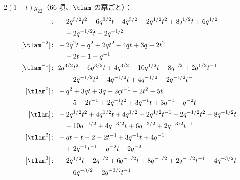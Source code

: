 $2(1 + t) g_{22}$（66 項、$\tlam$ の冪ごと）：
\begin{align*}
[\tlam^{-3}]\colon\ & -2 q^{3/2} t^{2} -6 q^{3/2} t -4 q^{3/2} +2 q^{1/2} t^{2} +8 q^{1/2} t +6 q^{1/2} \\
& \quad -2 q^{-1/2} t -2 q^{-1/2} \\
[\tlam^{-2}]\colon\ & -2 q^{2} t -q^{2} +2 q t^{2} +4 q t +3 q -2 t^{2} \\
& \quad -2 t -1 -q^{-1} \\
[\tlam^{-1}]\colon\ & 2 q^{3/2} t^{2} +6 q^{3/2} t +4 q^{3/2} -10 q^{1/2} t -8 q^{1/2} +2 q^{1/2} t^{-1} \\
& \quad -2 q^{-1/2} t^{2} +4 q^{-1/2} t +4 q^{-1/2} -2 q^{-1/2} t^{-1} \\
[\tlam^{0}]\colon\ & -q^{2} +3 q t +3 q +2 q t^{-1} -2 t^{2} -5 t \\
& \quad -5 -2 t^{-1} +2 q^{-1} t^{2} +3 q^{-1} t +3 q^{-1} -q^{-2} t \\
[\tlam]\colon\ & -2 q^{1/2} t^{2} +4 q^{1/2} t +4 q^{1/2} -2 q^{1/2} t^{-1} +2 q^{-1/2} t^{2} -8 q^{-1/2} t \\
& \quad -10 q^{-1/2} +4 q^{-3/2} t +6 q^{-3/2} +2 q^{-3/2} t^{-1} \\
[\tlam^{2}]\colon\ & -q t -t -2 -2 t^{-1} +3 q^{-1} t +4 q^{-1} \\
& \quad +2 q^{-1} t^{-1} -q^{-2} t -2 q^{-2} \\
[\tlam^{3}]\colon\ & -2 q^{1/2} t -2 q^{1/2} +6 q^{-1/2} t +8 q^{-1/2} +2 q^{-1/2} t^{-1} -4 q^{-3/2} t \\
& \quad -6 q^{-3/2} -2 q^{-3/2} t^{-1}
\end{align*}

